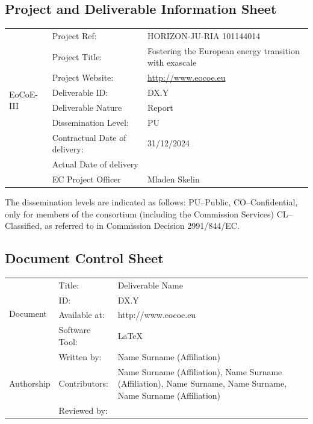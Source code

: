 \documentclass[a4paper,12pt]{article}
\newcommand{\DeliverableNumber}{DX.Y}
\newcommand{\DeliverableTitle}{Deliverable Name}
\begin{document}
\subsection*{Project and Deliverable Information Sheet}
\begin{center}
  \begin{tabular}{|p{}|p{}|p{}|}
    \hline
    \multirow[t]{8}{*}{EoCoE-III }
    & Project Ref:   & HORIZON-JU-RIA 101144014  \\[12pt]
    \cline{2-3}
    & Project Title: & Fostering the  European energy
                       transition with  exascale \\[12pt]
    \cline{2-3}
    & Project Website: &   \href{http://www.eocoe.eu}{http://www.eocoe.eu} \\[12pt]
    \cline{2-3}
    & Deliverable ID: & \DeliverableNumber \\[12pt]
    \cline{2-3}
    &  Deliverable Nature & Report    \\[12pt]
    \cline{2-3}
    & Dissemination Level: & PU \\[12pt]
    \cline{2-3}
    & Contractual Date of delivery: & 31/12/2024\\[12pt]
    \cline{2-3}
    & Actual Date of delivery & \\[12pt]
    \cline{2-3}
    & EC Project Officer & Mladen Skelin \\[12pt]
    \hline
  \end{tabular}
\end{center}

\par\noindent * The dissemination levels are indicated as follows:
PU--Public, CO--Conﬁdential, only for members of the consortium
(including the Commission Services) CL--Classiﬁed, as referred to in
Commission Decision 2991/844/EC.
\clearpage

\subsection*{Document Control Sheet}
\begin{center}
  \begin{tabular}{|p{}|p{}|p{}|}
    \hline
    \multirow[c]{4}{*}{Document}
    & Title: & \DeliverableTitle  \\[12pt]
    \cline{2-3}
    & ID:    & \DeliverableNumber \\[12pt]
    \cline{2-3}
    & Available at:& http://www.eocoe.eu \\[12pt]
    \cline{2-3}
    & Software Tool:  &  \LaTeX  \\[12pt]
    \hline 
    \multirow[c]{3}{*}{Authorship}
    & Written by:  & Name Surname (Affiliation) \\[12pt]
    \cline{2-3}
    & Contributors: & Name Surname (Affiliation),
                      Name Surname (Affiliation),
                      Name Surname, Name Surname, Name Surname (Affiliation) \\[12pt] 
    \cline{2-3}
    & Reviewed by: &  \\[12pt]
    \hline
  \end{tabular}
\end{center}
\end{document}
